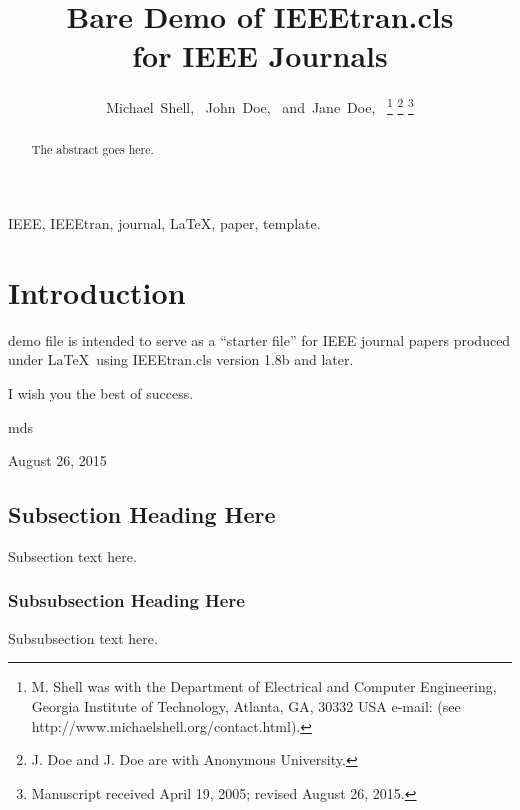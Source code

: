 \documentclass[journal]{IEEEtran}
\begin{document}
\title{Bare Demo of IEEEtran.cls\\ for IEEE Journals}

\author{Michael~Shell,~
        John~Doe,~
        and~Jane~Doe,~%
\thanks{M. Shell was with the Department
of Electrical and Computer Engineering, Georgia Institute of Technology, Atlanta,
GA, 30332 USA e-mail: (see http://www.michaelshell.org/contact.html).}%
\thanks{J. Doe and J. Doe are with Anonymous University.}%
\thanks{Manuscript received April 19, 2005; revised August 26, 2015.}}

\maketitle

\begin{abstract}
The abstract goes here.
\end{abstract}

\begin{IEEEkeywords}
IEEE, IEEEtran, journal, \LaTeX, paper, template.
\end{IEEEkeywords}

\IEEEpeerreviewmaketitle

\section{Introduction}

 demo file is intended to serve as a ``starter file''
for IEEE journal papers produced under \LaTeX\ using
IEEEtran.cls version 1.8b and later.

I wish you the best of success.

\hfill mds

\hfill August 26, 2015

\subsection{Subsection Heading Here}
Subsection text here.


\subsubsection{Subsubsection Heading Here}
Subsubsection text here.
\end{document}
